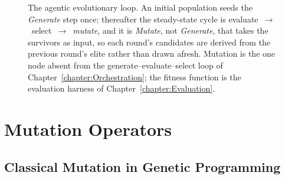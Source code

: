 \begin{figure}[htb!]
\begin{center}

\caption{The agentic evolutionary loop.
An initial population seeds the \emph{Generate} step once; thereafter the steady-state cycle is evaluate~$\to$~select~$\to$~\emph{mutate}, and it is \emph{Mutate}, not \emph{Generate}, that takes the survivors as input, so each round's candidates are derived from the previous round's elite rather than drawn afresh.
Mutation is the one node absent from the generate--evaluate--select loop of Chapter~\ref{chapter:Orchestration}; the fitness function is the evaluation harness of Chapter~\ref{chapter:Evaluation}.}
\label{figure:EvolutionaryLoop}
\end{center}
\end{figure}

\section{Mutation Operators}
\label{section:MutationOperators}

\subsection{Classical Mutation in Genetic Programming}


